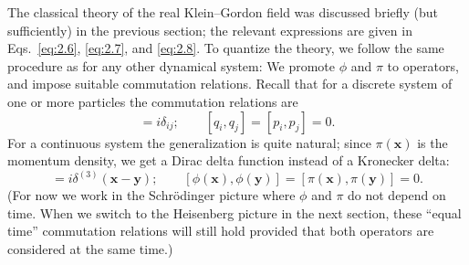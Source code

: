 The classical theory of the real Klein--Gordon field was discussed briefly
(but sufficiently) in the previous section; the relevant expressions are
given in Eqs.~\eqref{eq:2.6}, \eqref{eq:2.7}, and \eqref{eq:2.8}.  To
quantize the theory, we follow the same procedure as for any other
dynamical system: We promote $\phi$ and $\pi$ to operators, and impose
suitable commutation relations.  Recall that for a discrete system of one
or more particles the commutation relations are
\begin{equation}
  [q_i, p_j] = i\delta_{ij};\qquad
  [q_i, q_j] = [p_i, p_j] = 0.
\end{equation}
For a continuous system the generalization is quite natural; since
$\pi(\mathbf{x})$ is the momentum density, we get a Dirac delta function
instead of a Kronecker delta:
\begin{equation}
  [\phi(\mathbf{x}), \pi(\mathbf{y})] = i\delta^{(3)}(\mathbf{x}-\mathbf{y});
  \qquad
  [\phi(\mathbf{x}), \phi(\mathbf{y})]
  = [\pi(\mathbf{x}), \pi(\mathbf{y})] = 0 .
  \label{eq:2.20}
\end{equation}
(For now we work in the Schr\"odinger picture where $\phi$ and $\pi$ do
not depend on time.  When we switch to the Heisenberg picture in the next
section, these ``equal time'' commutation relations will still hold
provided that both operators are considered at the same time.)


